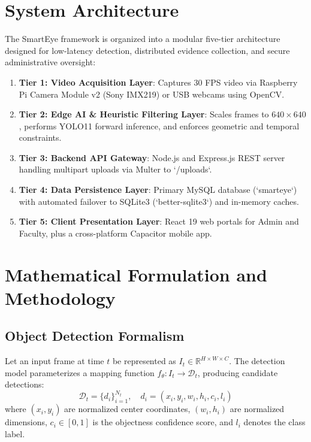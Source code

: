 \documentclass[conference]{IEEEtran}
\begin{document}
\section{System Architecture}
The SmartEye framework is organized into a modular five-tier architecture designed for low-latency detection, distributed evidence collection, and secure administrative oversight:
\begin{enumerate}
    \item \textbf{Tier 1: Video Acquisition Layer}: Captures 30 FPS video via Raspberry Pi Camera Module v2 (Sony IMX219) or USB webcams using OpenCV.
    \item \textbf{Tier 2: Edge AI \& Heuristic Filtering Layer}: Scales frames to $640 \times 640$, performs YOLO11 forward inference, and enforces geometric and temporal constraints.
    \item \textbf{Tier 3: Backend API Gateway}: Node.js and Express.js REST server handling multipart uploads via Multer to `/uploads`.
    \item \textbf{Tier 4: Data Persistence Layer}: Primary MySQL database (`smarteye`) with automated failover to SQLite3 (`better-sqlite3`) and in-memory caches.
    \item \textbf{Tier 5: Client Presentation Layer}: React 19 web portals for Admin and Faculty, plus a cross-platform Capacitor mobile app.
\end{enumerate}

\section{Mathematical Formulation and Methodology}

\subsection{Object Detection Formalism}
Let an input frame at time $t$ be represented as $I_t \in \mathbb{R}^{H \times W \times C}$. The detection model parameterizes a mapping function $f_\theta: I_t \to \mathcal{D}_t$, producing candidate detections:
\begin{equation}
\mathcal{D}_t = \{ d_i \}_{i=1}^{N_t}, \quad d_i = \left( x_i, y_i, w_i, h_i, c_i, l_i \right)
\end{equation}
where $(x_i, y_i)$ are normalized center coordinates, $(w_i, h_i)$ are normalized dimensions, $c_i \in [0, 1]$ is the objectness confidence score, and $l_i$ denotes the class label.
\end{document}
